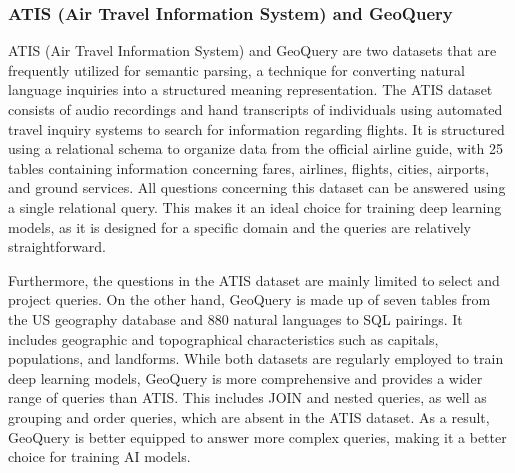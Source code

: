 \subsubsection{ATIS (Air Travel Information System) and GeoQuery}

ATIS (Air Travel Information System)\cite{dahl-etal-1994-expanding} and GeoQuery\cite{10.1007/3-540-44795-4_40} are two datasets that are frequently utilized for semantic parsing, a technique for converting natural language inquiries into a structured meaning representation. The ATIS dataset consists of audio recordings and hand transcripts of individuals using automated travel inquiry systems to search for information regarding flights. It is structured using a relational schema to organize data from the official airline guide, with 25 tables containing information concerning fares, airlines, flights, cities, airports, and ground services.
All questions concerning this dataset can be answered using a single relational query. This makes it an ideal choice for training deep learning models, as it is designed for a specific domain and the queries are relatively straightforward.

Furthermore, the questions in the ATIS dataset are mainly limited to select and project queries. On the other hand, GeoQuery is made up of seven tables from the US geography database and 880 natural languages to SQL pairings. It includes geographic and topographical characteristics such as capitals, populations, and landforms. While both datasets are regularly employed to train deep learning models, GeoQuery is more comprehensive and provides a wider range of queries than ATIS. This includes JOIN and nested queries, as well as grouping and order queries, which are absent in the ATIS dataset. As a result, GeoQuery is better equipped to answer more complex queries, making it a better choice for training AI models.




